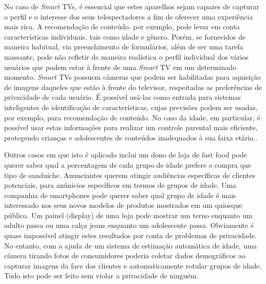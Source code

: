 No caso de \emph{Smart} TVs,
é essencial que estes aparelhos sejam capazes de capturar o perfil e o interesse dos seus telespectadores a fim de oferecer uma experiência mais rica.
A recomendação de conteúdo, por exemplo, pode levar em conta características individuais, tais como idade e gênero. Porém, se fornecidos de maneira habitual, via preenchimento de formulários, além de ser uma tarefa massante, pode não refletir de maneira realística o perfil individual dos vários usuários que podem estar à frente de uma \emph{Smart} TV em um determinado momento.
%
\emph{Smart} TVs possuem câmeras que podem ser habilitadas para aquisição de imagens daqueles que estão à frente do televisor, respeitadas as preferências de privacidade de cada usuário. É possível usá-las como entrada para sistemas inteligentes de identificação de características, cujas previsões podem ser usadas, por exemplo, para recomendação de conteúdo. No caso da idade, em particular, é possível usar estas informações para realizar um controle parental mais eficiente, protegendo crianças e adolescentes de conteúdos inadequados à sua faixa etária.\cite{Guardian:CameraSmartv}.

Outros casos em que isto é aplicado inclui
um dono de loja de fast food pode querer saber qual a porcentagem de cada grupo de idade prefere e compra que tipo de sanduíche. Anunciantes querem atingir audiências específicas de clientes potenciais, para anúnicios específicos em termos de grupos de idade. Uma companhia de smartphones pode querer saber qual grupo de idade é mais interessado nos seus novos modelos de produtos mostrados em um quiosque público. Um painel (display) de uma loja pode mostrar um terno enquanto um adulto passa ou uma calça jeans enquanto um adolescente passa. Obviamente é quase impossível atingir estes resultados por conta de problemas de privacidade. No entanto, com a ajuda de um sistema de estimação automática de idade, uma câmera tirando fotos de consumidores poderia coletar dados demográficos ao capturar imagens da face dos clientes e automaticamente rotular grupos de idade. Tudo isto pode ser feito sem violar a privacidade de ninguém.

